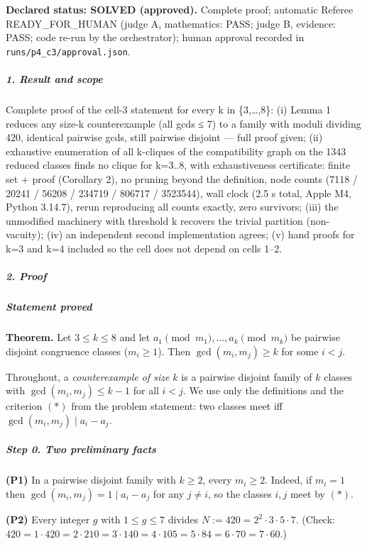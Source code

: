 \documentclass[11pt,a4paper]{article}
\begin{document}
\textbf{Declared status: SOLVED (approved).} Complete proof; automatic
Referee READY\_FOR\_HUMAN (judge A, mathematics: PASS; judge B,
evidence: PASS; code re-run by the orchestrator); human approval
recorded in \texttt{runs/p4\_c3/approval.json}.

\subparagraph{1. Result and scope}\label{result-and-scope}

Complete proof of the cell-3 statement for every k in \{3,\ldots,8\}:
(i) Lemma 1 reduces any size-k counterexample (all gcds ≤ 7) to a family
with moduli dividing 420, identical pairwise gcds, still pairwise
disjoint --- full proof given; (ii) exhaustive enumeration of all
k-cliques of the compatibility graph on the 1343 reduced classes finds
no clique for k=3..8, with exhaustiveness certificate: finite set +
proof (Corollary 2), no pruning beyond the definition, node counts (7118
/ 20241 / 56208 / 234719 / 806717 / 3523544), wall clock (2.5 s total,
Apple M4, Python 3.14.7), rerun reproducing all counts exactly, zero
survivors; (iii) the unmodified machinery with threshold k recovers the
trivial partition (non-vacuity); (iv) an independent second
implementation agrees; (v) hand proofs for k=3 and k=4 included so the
cell does not depend on cells 1--2.

\subparagraph{2. Proof}\label{proof}

\subparagraph{Statement proved}\label{statement-proved}

\textbf{Theorem.} Let \(3 \le k \le 8\) and let
\(a_1 \pmod{m_1},\dots,a_k \pmod{m_k}\) be pairwise disjoint congruence
classes (\(m_i\ge 1\)). Then \(\gcd(m_i,m_j)\ge k\) for some \(i<j\).

Throughout, a \emph{counterexample of size \(k\)} is a pairwise disjoint
family of \(k\) classes with \(\gcd(m_i,m_j)\le k-1\) for all \(i<j\).
We use only the definitions and the criterion \((*)\) from the problem
statement: two classes meet iff \(\gcd(m_i,m_j)\mid a_i-a_j\).

\subparagraph{Step 0. Two preliminary
facts}\label{step-0.-two-preliminary-facts}

\textbf{(P1)} In a pairwise disjoint family with \(k\ge2\), every
\(m_i\ge 2\). Indeed, if \(m_i=1\) then \(\gcd(m_i,m_j)=1\mid a_i-a_j\)
for any \(j\neq i\), so the classes \(i,j\) meet by \((*)\).

\textbf{(P2)} Every integer \(g\) with \(1\le g\le 7\) divides
\(N:=420=2^2\cdot3\cdot5\cdot7\). (Check:
\(420=1\cdot420=2\cdot210=3\cdot140=4\cdot105=5\cdot84=6\cdot70=7\cdot60\).)
\end{document}
